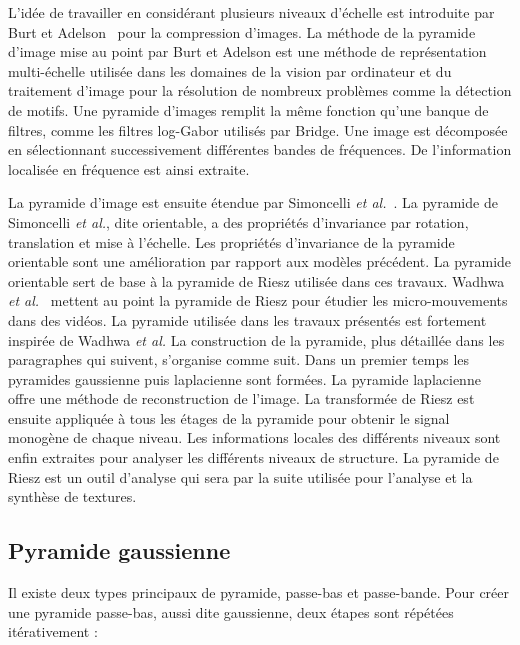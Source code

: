 L'idée de travailler en considérant plusieurs niveaux d'échelle est introduite par Burt et Adelson~\cite{burt_laplacian_1983} pour la compression d'images. La méthode de la pyramide d'image mise au point par Burt et Adelson est une méthode de représentation multi-échelle utilisée dans les domaines de la vision par ordinateur et du traitement d'image pour la résolution de nombreux problèmes comme la détection de motifs. Une pyramide d'images remplit la même fonction qu'une banque de filtres, comme les filtres log-Gabor utilisés par Bridge. Une image est décomposée en sélectionnant successivement différentes bandes de fréquences. De l'information localisée en fréquence est ainsi extraite.

\bigskip

La pyramide d'image est ensuite étendue par Simoncelli \textit{et al.}~\cite{simoncelli_shiftable_1992}. La pyramide de Simoncelli \textit{et al.}, dite orientable, a des propriétés d'invariance par rotation, translation et mise à l'échelle. Les propriétés d'invariance de la pyramide orientable sont une amélioration par rapport aux modèles précédent. La pyramide orientable sert de base à la pyramide de Riesz utilisée dans ces travaux. Wadhwa \textit{et al.}~\cite{wadhwa_phase_based_2013} mettent au point la pyramide de Riesz pour étudier les micro-mouvements dans des vidéos. La pyramide utilisée dans les travaux présentés est fortement inspirée de Wadhwa \textit{et al.} La construction de la pyramide, plus détaillée dans les paragraphes qui suivent, s'organise comme suit. Dans un premier temps les pyramides gaussienne puis laplacienne sont formées. La pyramide laplacienne offre une méthode de reconstruction de l'image. La transformée de Riesz est ensuite appliquée à tous les étages de la pyramide pour obtenir le signal monogène de chaque niveau. Les informations locales des différents niveaux sont enfin extraites pour analyser les différents niveaux de structure. La pyramide de Riesz est un outil d'analyse qui sera par la suite utilisée pour l'analyse et la synthèse de textures.

\subsection{Pyramide gaussienne}

Il existe deux types principaux de pyramide, passe-bas et passe-bande. Pour créer une pyramide passe-bas, aussi dite gaussienne, deux étapes sont répétées itérativement :

\bigskip

